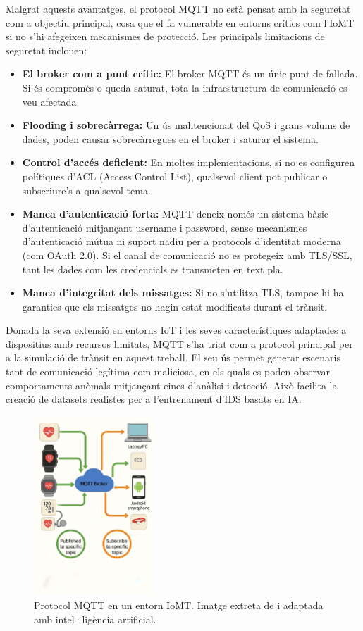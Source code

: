 Malgrat aquests avantatges, el protocol MQTT no està pensat amb la seguretat com a objectiu principal, cosa que el fa vulnerable en entorns crítics com l’IoMT si no s’hi afegeixen mecanismes de protecció. Les principals limitacions de seguretat inclouen:  
  \begin{itemize} 
      \item \textbf{El broker com a punt crític:} El broker MQTT és un únic punt de fallada. Si és compromès o queda saturat, tota la infraestructura de comunicació es veu afectada.
      \item \textbf{Flooding i sobrecàrrega:} Un ús malitencionat del QoS i grans volums de dades, poden causar sobrecàrregues en el broker i saturar el sistema.
      \item \textbf{Control d’accés deficient:} En moltes implementacions, si no es configuren polítiques d’ACL (Access Control List), qualsevol client pot publicar o subscriure’s a qualsevol tema.
      \item \textbf{Manca d’autenticació forta:} MQTT deneix només un sistema bàsic d’autenticació mitjançant username i password, sense mecanismes d’autenticació mútua ni suport nadiu per a protocols d’identitat moderna (com OAuth 2.0). Si el canal de comunicació no es protegeix amb TLS/SSL, tant les dades com les credencials es transmeten en text pla.
      \item \textbf{Manca d’integritat dels missatges:} Si no s’utilitza TLS, tampoc hi ha garanties que els missatges no hagin estat modificats durant el trànsit.
  \end{itemize}

 Donada la seva extensió en entorns IoT i les seves característiques adaptades a dispositius amb recursos limitats, MQTT s’ha triat com a protocol principal per a la simulació de trànsit en aquest treball. El seu ús permet generar escenaris tant de comunicació legítima com maliciosa, en els quals es poden observar comportaments anòmals mitjançant eines d’anàlisi i detecció. Això facilita la creació de datasets realistes per a l’entrenament d’IDS basats en IA.     
  
 \begin{figure}[H]
    \centering
    \includegraphics[width=0.4\textwidth]{img/MQTT_IoMT.jpg}
    \caption{Protocol MQTT en un entorn IoMT. Imatge extreta de \cite{mqttfig} i adaptada amb intel·ligència artificial.}
  \end{figure}

